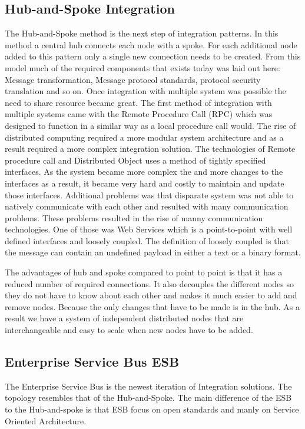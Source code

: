 \documentclass{llncs}
\begin{document}
\subsection{Hub-and-Spoke Integration}
The Hub-and-Spoke method is the next step of integration patterns. In this method a central hub connects each node with a spoke. For each additional node added to this pattern only a single new connection needs to be created. From this model much of the required components that exists today was laid out here: Message transformation, Message protocol standards, protocol security translation and so on. Once integration with multiple system was possible the need to share resource became great. The first method of integration with multiple systems came with the Remote Procedure Call (RPC) which was designed to function in a similar way as a local procedure call would. The rise of distributed computing required a more modular system architecture and as a result required a more complex integration solution. The technologies of Remote procedure call and Distributed Object uses a method of tightly specified interfaces. As the system became more complex the and more changes to the interfaces as a result, it became very hard and costly to maintain and update those interfaces. Additional problems was that disparate system was not able to natively communicate with each other and resulted with many communication problems. These problems resulted in the rise of manny communication technologies. One of those was Web Services which is a point-to-point with well defined interfaces and loosely coupled. The definition of loosely coupled is that the message can contain an undefined payload in either a text or a binary format.

The advantages of hub and spoke compared to point to point is that it has a reduced number of required connections. It also decouples the different nodes so they do not have to know about each other and makes it much easier to add and remove nodes. Because the only changes that have to be made is in the hub. As a result we have a system of independent distributed nodes that are interchangeable and easy to scale when new nodes have to be added.

\subsection{Enterprise Service Bus ESB}
The Enterprise Service Bus is the newest iteration of Integration solutions. The topology resembles that of the Hub-and-Spoke. The main difference of the ESB to the Hub-and-spoke is that ESB focus on open standards and manly on Service Oriented Architecture.
\end{document}
